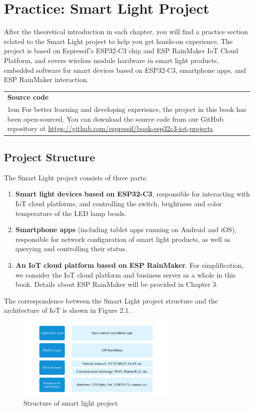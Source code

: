 \documentclass[a4paper,12pt,openany]{book}
\newcommand{\note}[2][NOTE]{ %
\vspace{6pt}
\begin{tabular}{b{\textwidth}}
\hline
\fontfamily{phv}\selectfont \textbf{#1}\\
\leftskip 1em #2\\
\hline
\end{tabular}
}
\begin{document}
\section{Practice: Smart Light Project}
After the theoretical introduction in each chapter, you will find a practice section related to the Smart Light project to help you get hands-on experience. The project is based on Espressif’s ESP32-C3 chip and ESP RainMaker IoT Cloud Platform, and covers wireless module hardware in smart light products, embedded software for smart devices based on ESP32-C3, smartphone apps, and ESP RainMaker interaction.

\note[Source code]{
For better learning and developing experience, the project in this book has been open-sourced. You can download the source code from our GitHub repository at \url{https://github.com/espressif/book-esp32c3-iot-projects}.}

\subsection{Project Structure}
The Smart Light project consists of three parts:

\begin{enumerate}[label=\roman*.]
    \item \textbf{Smart light devices based on ESP32-C3}, responsible for interacting with IoT cloud platforms, and controlling the switch, brightness and color temperature of the LED lamp beads.
    \item \textbf{Smartphone apps} (including tablet apps running on Android and iOS), responsible for network configuration of smart light products, as well as querying and controlling their status.
    \item \textbf{An IoT cloud platform based on ESP RainMaker}. For simplification, we consider the IoT cloud platform and business server as a whole in this book. Details about ESP RainMaker will be provided in Chapter 3.
\end{enumerate}

The correspondence between the Smart Light project structure and the architecture of IoT is shown in Figure 2.1.

\begin{figure}[!ht]
    \centering
    \includegraphics[width=0.7\textwidth]{D2Z/2-1}
    \caption{Structure of smart light project}
\end{figure}
\end{document}
